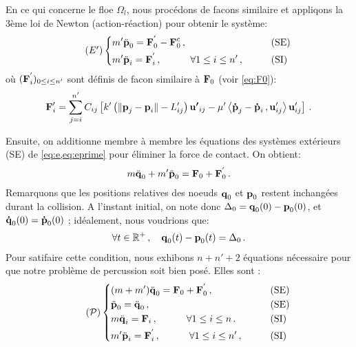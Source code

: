 En ce qui concerne le floe $\Omega_l$, nous procédons de facons similaire et appliqons la 3ème loi de Newton (action-réaction) pour obtenir le système:
\begin{align} \tag{$E'$} \label{eq:eprime}
\begin{dcases}
    m' \ddot{\bm{\mathrm{p}}}_0 = \bm{\mathrm{F}}^{'}_0 - \bm{\mathrm{F}}^c_0  \,, &\qquad \text{(SE)} \\
    m' \ddot{\bm{\mathrm{p}}}_i = \bm{\mathrm{F}}^{'}_i   \,, \quad \quad \quad \forall 1 \leq i \leq n' \,, &\qquad \text{(SI)}
\end{dcases}
\end{align}
où $(\bm{\mathrm{F}}^{'}_i)_{0 \leq i \leq n'}$ sont définis de facon similaire à $\bm{\mathrm{F}}_0$ (voir \cref{eq:F0}):
\begin{align}
    \bm{\mathrm{F}}'_i = \sum_{j=i}^{n'}C_{ij} \left[ k' \left( \Vert \bm{\mathrm{p}}_j - \bm{\mathrm{p}}_i \Vert - L'_{ij} \right) \bm{\mathrm{u'}}_{ij} - \mu' \left\langle \bm{\mathrm{\dot{p}}}_j - \bm{\mathrm{\dot{p}}}_i\,, \bm{\mathrm{u}}'_{ij}  \right\rangle  \bm{\mathrm{u}}'_{ij}  \right] \,.
\end{align}

\noindent Ensuite, on additionne membre à membre les équations des systèmes extérieurs (SE) de \cref{eq:e,eq:eprime} pour éliminer la force de contact. On obtient:
\begin{align}
m \ddot{\bm{\mathrm{q}}}_0 + m' \ddot{\bm{\mathrm{p}}}_0 = \bm{\mathrm{F}}_0 + \bm{\mathrm{F}}^{'}_0 \,.
\end{align}
Remarquons que les positions relatives des noeuds $\bm{\mathrm{q}}_0$ et $\bm{\mathrm{p}}_0$ restent inchangées durant la collision. A l'instant initial, on note donc $\Delta_0 = \bm{\mathrm{q}}_0(0) - \bm{\mathrm{p}}_0(0)$, et $\bm{\mathrm{\dot q}}_0(0) = \bm{\mathrm{\dot p}}_0(0)$ ; idéalement, nous voudrions que:
\begin{align}
\forall t \in \mathbb{R}^+ \,, \quad \bm{\mathrm{q}}_0(t) - \bm{\mathrm{p}}_0(t) = \Delta_0\,.
\end{align}
Pour satifaire cette condition, nous exhibons $n+n'+2$ équations nécessaire pour que notre problème de percussion soit bien posé. Elles sont :
\begin{align} \tag{$\mathcal{P}$} \label{eq:problemeP}
\begin{dcases}
    (m+m') \ddot{\bvec{q}}_0  = \bvec{F}_0 + \bvec{F}^{'}_0  \,, &\qquad \text{(SE)} \\
    \ddot{\bvec{p}}_0 = \ddot{\bvec{q}}_0 \,, &\qquad \text{(SE)} \\
    m \ddot{\bvec{q}}_i = \bvec{F}_i   \,, \quad \quad \quad \forall 1 \leq i \leq n \,. &\qquad \text{(SI)} \\
    m' \ddot{\bvec{p}}_i = \bvec{F}^{'}_i   \,, \quad \quad \quad \forall 1 \leq i \leq n' \,, &\qquad \text{(SI)}
\end{dcases}
\end{align}

